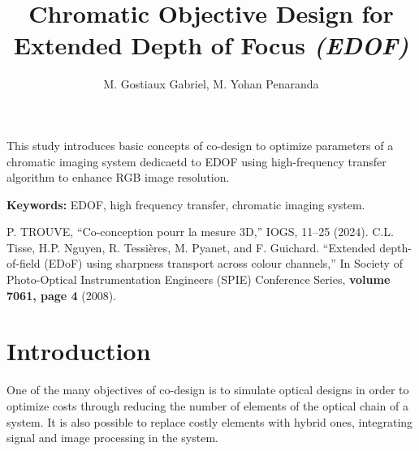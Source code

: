 \documentclass[10pt,letterpaper]{article}
\begin{document}
\title{Chromatic Objective Design for Extended Depth of Focus \textit{(EDOF)}}

\author{M. Gostiaux Gabriel, M. Yohan Penaranda}

\address{M. Gabriel Gostiaux, Master of Science student, Institute of Optics, \\ Palaiseau, 91 120, France}




\begin{abstract*}
This study introduces basic concepts of co-design to optimize parameters of a chromatic imaging system dedicaetd to EDOF using high-frequency transfer algorithm to enhance RGB image resolution.
\linebreak

\textbf{Keywords:} EDOF, high frequency transfer, chromatic imaging system.
\linebreak

\end{abstract*}


\begin{thebibliography}{99}

 P. TROUVE, ``Co-conception pourr la mesure 3D,'' IOGS, 11--25 (2024).
 C.L. Tisse, H.P. Nguyen, R. Tessières, M. Pyanet, and F. Guichard. ``Extended
depth-of-field (EDoF) using sharpness transport across colour channels,'' In
Society of Photo-Optical Instrumentation Engineers (SPIE) Conference Series, {\bf volume 7061, page 4} (2008).

\end{thebibliography}

\section{Introduction}
One of the many objectives of co-design is to simulate optical designs in order to optimize costs through reducing the number of elements of the optical chain of a system. It is also possible to replace costly elements with hybrid ones, integrating signal and image processing in the system.
\end{document}
